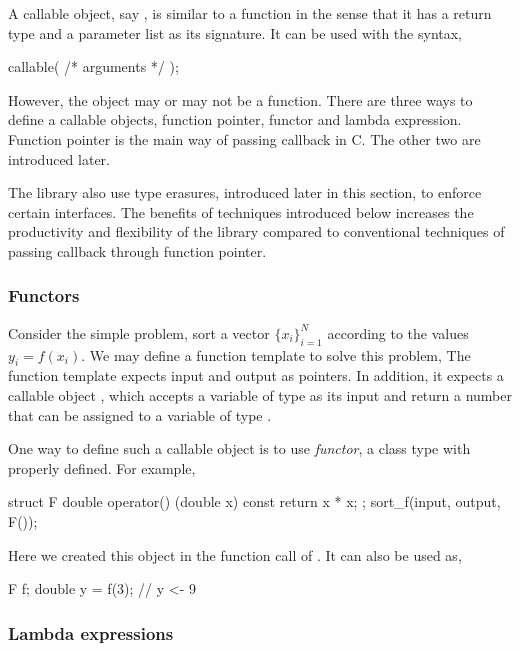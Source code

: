 A callable object, say , is similar to a function in the
sense that it has a return type and a parameter list as its signature. It can
be used with the syntax,
\begin{cppcode}
callable( /* arguments */ );
\end{cppcode}
However, the object may or may not be a function. There are three ways to
define a callable objects, function pointer, functor and \cppoo lambda
expression. Function pointer is the main way of passing callback in C. The
other two are introduced later.

The library also use type erasures, introduced later in this section, to
enforce certain interfaces. The benefits of techniques introduced below
increases the productivity and flexibility of the library compared to
conventional techniques of passing callback through function pointer.

\subsubsection{Functors}
\label{ssub:Functors}

Consider the simple problem, sort a vector $\{x_i\}_{i=1}^N$ according to the
values $y_i = f(x_i)$. We may define a function template to solve this
problem,
The function template  expects input and output as pointers.
In addition, it expects a callable object , which accepts a
variable of type  as its input and return a number that can
be assigned to a variable of type .

One way to define such a callable object is to use \emph{functor}, a class
type with  properly defined. For example,
\begin{cppcode}
struct F
{
    double operator() (double x) const { return x * x; }
};
sort_f(input, output, F());
\end{cppcode}
Here we created this object in the function call of . It can
also be used as,
\begin{cppcode}
F f;
double y = f(3); // y <- 9
\end{cppcode}

\subsubsection{Lambda expressions}
\label{ssub:Lambda expressions}

